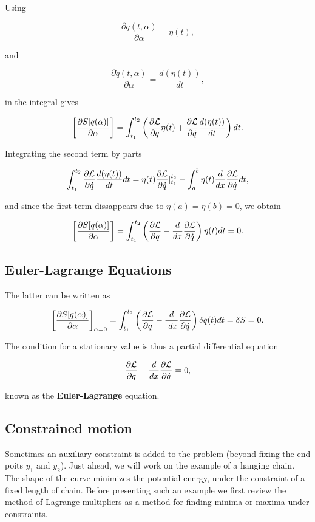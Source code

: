 \documentclass[%
oneside,                 %
final,                   %
10pt]{article}
\begin{document}
Using

\[
\frac{\partial q(t,\alpha)}{\partial \alpha}=\eta(t),
\]

and

\[
\frac{\partial \dot{q}(t,\alpha)}{\partial \alpha}=\frac{d(\eta(t))}{dt},
\]

in the integral gives

\[
\left[\frac{\partial  S[q(\alpha)]}{\partial \alpha}\right]=\int_{t_1}^{t_2} \left( \frac{\partial {\cal L}}{\partial q}\eta(t)+\frac{\partial {\cal L}}{\partial \dot{q}}\frac{d(\eta(t))}{dt}\right)dt.
\]

Integrating the second term by parts

\[
\int_{t_1}^{t_2} \frac{\partial {\cal L}}{\partial \dot{q}}\frac{d(\eta(t))}{dt}dt =\eta(t)\frac{\partial {\cal L}}{\partial \dot{q}}|_{t_1}^{t_2}-
\int_a^b \eta(t)\frac{d}{dx}\frac{\partial {\cal L}}{\partial \dot{q}}dt,
\]

and since the first term dissappears due to $\eta(a)=\eta(b)=0$, we obtain

\[
\left[\frac{\partial  S[q(\alpha)]}{\partial \alpha}\right]=\int_{t_1}^{t_2} \left( \frac{\partial {\cal L}}{\partial q}-\frac{d}{dx}\frac{\partial {\cal L}}{\partial \dot{q}}
\right)\eta(t)dt=0.
\]

\subsection*{Euler-Lagrange Equations}

The latter can be written as

\[
\left[\frac{\partial  S[q(\alpha)]}{\partial \alpha}\right]_{\alpha=0}=\int_{t_1}^{t_2} \left( \frac{\partial {\cal L}}{\partial q}-\frac{d}{\
dx}\frac{\partial {\cal L}}{\partial \dot{q}}\right)\delta q(t)dt=\delta S = 0.
\]

The condition for a stationary value is thus a partial differential equation

\[
\frac{\partial {\cal L}}{\partial q}-\frac{d}{dx}\frac{\partial {\cal L}}{\partial \dot{q}}=0,
\]

known as the \textbf{Euler-Lagrange} equation.

\subsection*{Constrained motion}

Sometimes an auxiliary constraint is added to the problem (beyond
fixing the end poits $y_1$ and $y_2$). Just ahead, we will work on the
example of a hanging chain. The shape of the curve minimizes the
potential energy, under the constraint of a fixed length of
chain. Before presenting such an example we first review the method of
Lagrange multipliers as a method for finding minima or maxima under
constraints.
\end{document}
